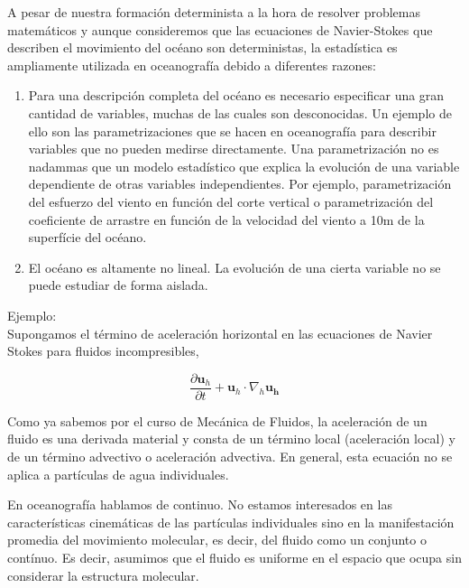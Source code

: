 \documentclass[
]{agujournal2019}
\begin{document}
A pesar de nuestra formación determinista a la hora de resolver
problemas matemáticos y aunque consideremos que las ecuaciones de
Navier-Stokes que describen el movimiento del océano son deterministas,
la estadística es ampliamente utilizada en oceanografía debido a
diferentes razones:

\begin{enumerate}
\def\labelenumi{\arabic{enumi}.}
\item
  Para una descripción completa del océano es necesario especificar una
  gran cantidad de variables, muchas de las cuales son desconocidas. Un
  ejemplo de ello son las parametrizaciones que se hacen en oceanografía
  para describir variables que no pueden medirse directamente. Una
  parametrización no es nadammas que un modelo estadístico que explica
  la evolución de una variable dependiente de otras variables
  independientes. Por ejemplo, parametrización del esfuerzo del viento
  en función del corte vertical o parametrización del coeficiente de
  arrastre en función de la velocidad del viento a 10m de la superfície
  del océano.
\item
  El océano es altamente no lineal. La evolución de una cierta variable
  no se puede estudiar de forma aislada.
\end{enumerate}

\vspace{0.5cm}

Ejemplo:\\
Supongamos el término de aceleración horizontal en las ecuaciones de
Navier Stokes para fluidos incompresibles,

\begin{equation}
\frac{\partial{\mathbf {u}_h}}{\partial{t}} + \mathbf {u}_h \cdot {\nabla}_h \mathbf {{u}_h}
\end{equation}

Como ya sabemos por el curso de Mecánica de Fluidos, la aceleración de
un fluido es una derivada material y consta de un término local
(aceleración local) y de un término advectivo o aceleración advectiva.
En general, esta ecuación no se aplica a partículas de agua
individuales.

En oceanografía hablamos de continuo. No estamos interesados en las
características cinemáticas de las partículas individuales sino en la
manifestación promedia del movimiento molecular, es decir, del fluido
como un conjunto o contínuo. Es decir, asumimos que el fluido es
uniforme en el espacio que ocupa sin considerar la estructura molecular.
\end{document}
